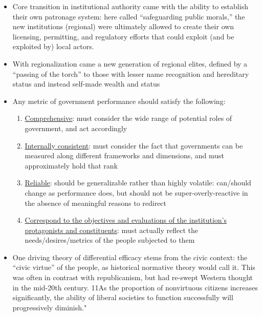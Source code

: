\documentclass[12pt]{article}
\begin{document}
\begin{itemize}[leftmargin=*, itemsep=4pt]
    \begin{align*}
        \text{Societal demands} & \implies \text{Political interaction} \\
        & \implies \text{Government} \\
        & \implies \text{Policy choice} \\
        & \implies \text{Implementation}
    \end{align*}
    ``A high-performance democratic institution must be both responsive and effective: sensitive to the demands of its constituents and effective in using limited resources to address those demands.''
    \item Core transition in institutional authority came with the ability to establish their own patronage system: here called ``safeguarding public morals,'' the new institutions (regional) were ultimately allowed to create their own licensing, permitting, and regulatory efforts that could exploit (and be exploited by) local actors.
    \item With regionalization came a new generation of regional elites, defined by a ``passing of the torch'' to those with lesser name recognition and hereditary status and instead self-made wealth and status
    \item Any metric of government performance should satisfy the following:
    \begin{enumerate}
        \item \underline{Comprehensive}: must consider the wide range of potential roles of government, and act accordingly
        \item \underline{Internally consistent}: must consider the fact that governments can be measured along different frameworks and dimensions, and must approximately hold that rank
        \item \underline{Reliable}: should be generalizable rather than highly volatile: can/should change as performance does, but should not be super-overly-reactive in the absence of meaningful reasons to redirect
        \item \underline{Correspond to the objectives and evaluations of the institution's protagonists and constituents}: must actually reflect the needs/desires/metrics of the people subjected to them
    \end{enumerate}
    \item One driving theory of differential efficacy stems from the civic context: the ``civic virtue'' of the people, as historical normative theory would call it. This was often in contrast with republicanism, but had re-swept Western thought in the mid-20th century. 11As the proportion of nonvirtuous citizens increases significantly, the ability of liberal societies to function successfully will progressively diminish."

\end{itemize}
\end{document}
